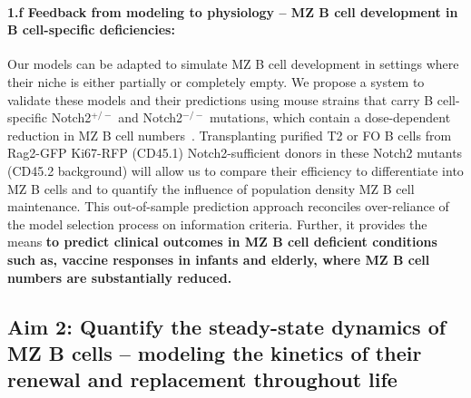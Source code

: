 \documentclass[11pt]{article}
\newcommand\ie{$\textit{i.e.}$}
\newcommand{\para}[1]{\vspace*{-4.5mm}\paragraph{#1}}
\begin{document}
\para{{1.f Feedback from modeling to physiology -- MZ B cell development in B cell-specific deficiencies:}}
Our models can be adapted to simulate MZ B cell development in settings where their niche is either partially or completely empty. %
We propose a system to validate these models and their predictions using mouse strains that carry B cell-specific Notch2$^{+/-}$ and Notch2$^{-/-}$ mutations, which contain a dose-dependent reduction in MZ B cell numbers~\cite{Witt_2003, Saito_2003}.
Transplanting purified T2 or FO B cells from Rag2-GFP Ki67-RFP (CD45.1) Notch2-sufficient donors in these Notch2 mutants (CD45.2 background) will allow us to compare their efficiency to differentiate into MZ B cells and to quantify the influence of population density MZ B cell maintenance. 
This out-of-sample prediction approach reconciles over-reliance of the model selection process on information criteria. %
Further, it provides the means \textbf{to predict clinical outcomes in MZ B cell deficient conditions such as, vaccine responses in infants and elderly, where MZ B cell numbers are substantially reduced.
}

%
%
%



\subsection*{Aim 2: Quantify the steady-state dynamics of MZ B cells -- modeling the kinetics of their\\ renewal and replacement throughout life}
\end{document}
